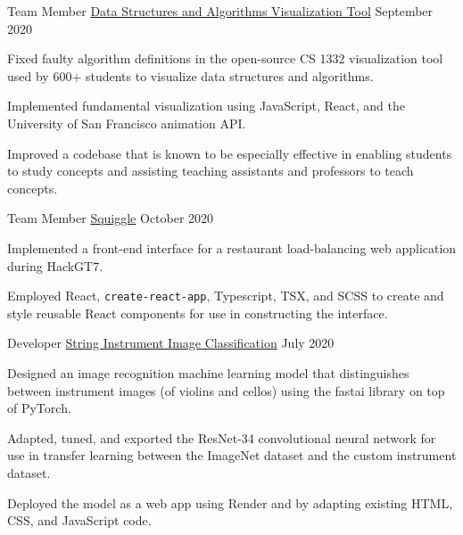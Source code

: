 \begin{cventries}

\cvproject
{Team Member} %
{
    \href{https://github.com/RodrigoDLPontes/visualization-tool}
    {Data Structures and Algorithms Visualization Tool}
} %
{} %
{September 2020} %
{ %
\begin{cvitems}
\item Fixed faulty algorithm definitions in the open-source CS 1332 visualization tool
used by 600+ students to visualize data structures and algorithms.
\item Implemented fundamental visualization using JavaScript, React,
and the University of San Francisco animation API.
\item Improved a codebase that is known to be especially effective
in enabling students to study concepts and assisting teaching assistants and professors to teach concepts.
\end{cvitems}
}

\cvproject
{Team Member} %
{
    \href{https://github.com/BadGuy-1863/HackGT7}
    {Squiggle}
} %
{} %
{October 2020} %
{ %
\begin{cvitems}
    \item Implemented a front-end interface for a restaurant load-balancing web application
    during HackGT7.
    \item Employed React, \texttt{create-react-app}, Typescript, TSX, and SCSS to 
    create and style reusable React components for use in constructing the interface.
\end{cvitems}
}

\cvproject
{Developer} %
{
    \href{https://github.com/hzhu359/fastai-v3}
    {String Instrument Image Classification}
} %
{} %
{July 2020} %
{ %
\begin{cvitems}
\item Designed an image recognition machine learning model
that distinguishes between instrument images (of violins and cellos)
using the fastai library on top of PyTorch.
\item Adapted, tuned, and exported the ResNet-34 convolutional neural network for use in transfer learning between the ImageNet dataset and the custom instrument dataset.
\item Deployed the model as a web app using Render and by adapting existing HTML, CSS, and JavaScript code.
\end{cvitems}
}


\end{cventries}

